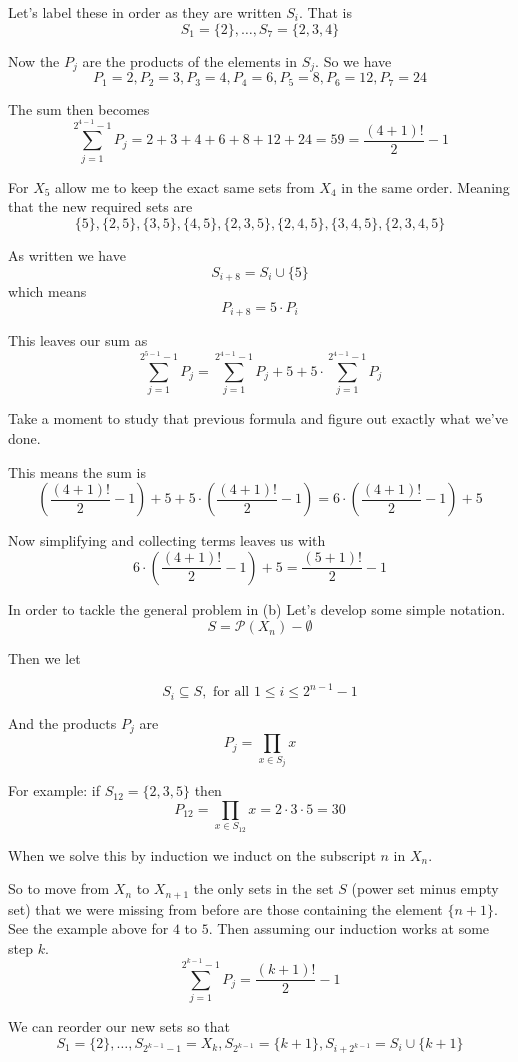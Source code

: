 \documentclass[16 pt]{amsart}
\theoremstyle{definition}
\theoremstyle{remark}
\numberwithin{equation}{subsection}
\begin{document}
Let's label these in order as they are written $S_i$.  That is
\[
S_1 = \{2\} ,\dots, S_7 = \{2,3,4\}
\]

Now the $P_j$ are the products of the elements in $S_j$.  So we have
\[
P_1 = 2,P_2=3,P_3=4,P_4 = 6, P_5 = 8, P_6 = 12, P_7 =24
\]

The sum then becomes
\[
\sum_{j=1}^{2^{4-1}-1} P_j = 2+3+4+6+8+12+24 = 59 =\frac{(4+1)!}{2}-1
\]

For $X_5$ allow me to keep the exact same sets from $X_4$ in the same order.  Meaning that the new required sets are
\[
\{5\},\{2,5\},\{3,5\},\{4,5\},\{2,3,5\},\{2,4,5\},\{3,4,5\},\{2,3,4,5\}
\]

As written we have
\[
S_{i+8} = S_i \cup \{5\} 
\]
which means
\[
P_{i+8} = 5\cdot P_i
\]

This leaves our sum as
\[
\sum_{j=1}^{2^{5-1}-1} P_j = \sum_{j=1}^{2^{4-1}-1} P_j + 5 + 5\cdot\sum_{j=1}^{2^{4-1}-1} P_j
\]

Take a moment to study that previous formula and figure out exactly what we've done.

This means the sum is
\[
\left(\frac{(4+1)!}{2}-1\right) + 5 + 5\cdot\left(\frac{(4+1)!}{2}-1\right) = 6\cdot\left(\frac{(4+1)!}{2}-1\right) + 5
\]

Now simplifying and collecting terms leaves us with
\[
6\cdot\left(\frac{(4+1)!}{2}-1\right) + 5 = \frac{(5+1)!}{2}-1
\]

\vspace{.25in}

In order to tackle the general problem in (b) Let's develop some simple notation.
\[
S = \mathcal{P}(X_n) - \emptyset
\]

Then we let

\[
S_i \subseteq S, \text{ for all } 1\le i \le 2^{n-1}-1
\]

And the products $P_j$ are
\[
P_j = \prod_{x\in S_j} x
\]

For example: if $S_{12} = \{2,3,5\}$ then
\[
P_{12} = \prod_{x \in S_{12}} x = 2\cdot 3\cdot 5 =30
\]


When we solve this by induction we induct on the subscript $n$ in $X_n$.

So to move from $X_n$ to $X_{n+1}$ the only sets in the set $S$ (power set minus empty set) that we were missing from before are those containing the element $\{n+1\}$.  See the example above for $4$ to $5$.  Then assuming our induction works at some step $k$. 
\[
\sum_{j=1}^{2^{k-1}-1} P_j = \frac{(k+1)!}{2} - 1
\]

We can reorder our new sets so that
\[
S_1 = \{2\} ,\dots, S_{2^{k-1}-1} = X_k, S_{2^{k-1}} = \{k+1\}, S_{i+2^{k-1}} = S_i \cup \{k+1\}
\]
\end{document}
